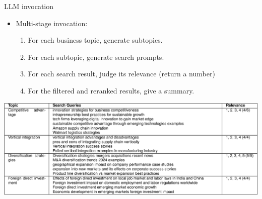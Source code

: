 \documentclass{beamer}
\begin{document}
\begin{frame}{LLM invocation}
	\begin{itemize}
	\item Multi-stage invocation: 
		\begin{enumerate}
		\item For each business topic, generate subtopics.
		\item For each subtopic, generate search prompts.
		\item For each search result, judge its relevance (return a number)
		\item For the filtered and reranked results, give a summary.
		\end{enumerate}
	\end{itemize}
	\begin{center}
	\includegraphics[height=.4\textheight]{../../deliverables/thesis/res/table_search_queries.png}
	\end{center}
\end{frame}
\end{document}
